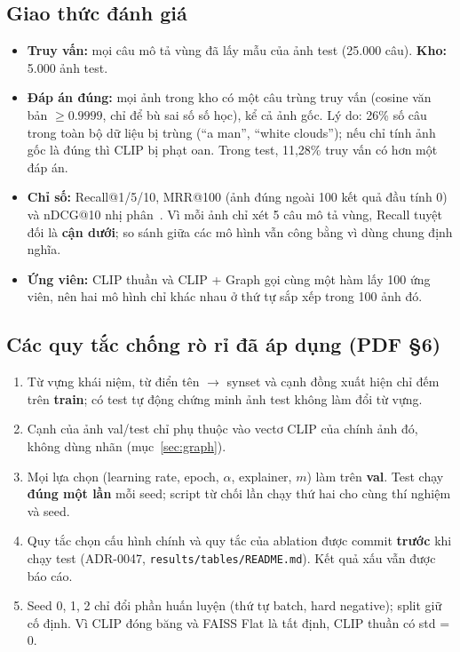 \documentclass[12pt, a4paper]{article}
\newcommand{\code}[1]{\texttt{#1}}
\begin{document}
\subsection{Giao thức đánh giá}
\label{sec:protocol}
\begin{itemize}
\item \textbf{Truy vấn:} mọi câu mô tả vùng đã lấy mẫu của ảnh test (25.000 câu). \textbf{Kho:} 5.000 ảnh test.
\item \textbf{Đáp án đúng:} mọi ảnh trong kho có một câu trùng truy vấn (cosine văn bản $\ge 0.9999$, chỉ để bù sai số số học), kể cả ảnh gốc. Lý do: 26\% số câu trong toàn bộ dữ liệu bị trùng (``a man'', ``white clouds''); nếu chỉ tính ảnh gốc là đúng thì CLIP bị phạt oan. Trong test, 11,28\% truy vấn có hơn một đáp án.
\item \textbf{Chỉ số:} Recall@1/5/10, MRR@100 (ảnh đúng ngoài 100 kết quả đầu tính 0) và nDCG@10 nhị phân~\cite{jarvelin2002ndcg}. Vì mỗi ảnh chỉ xét 5 câu mô tả vùng, Recall tuyệt đối là \textbf{cận dưới}; so sánh giữa các mô hình vẫn công bằng vì dùng chung định nghĩa.
\item \textbf{Ứng viên:} CLIP thuần và CLIP + Graph gọi cùng một hàm lấy 100 ứng viên, nên hai mô hình chỉ khác nhau ở thứ tự sắp xếp trong 100 ảnh đó.
\end{itemize}

\subsection{Các quy tắc chống rò rỉ đã áp dụng (PDF §6)}
\begin{enumerate}
\item Từ vựng khái niệm, từ điển tên $\to$ synset và cạnh đồng xuất hiện chỉ đếm trên \textbf{train}; có test tự động chứng minh ảnh test không làm đổi từ vựng.
\item Cạnh của ảnh val/test chỉ phụ thuộc vào vectơ CLIP của chính ảnh đó, không dùng nhãn (mục~\ref{sec:graph}).
\item Mọi lựa chọn (learning rate, epoch, $\alpha$, explainer, $m$) làm trên \textbf{val}. Test chạy \textbf{đúng một lần} mỗi seed; script từ chối lần chạy thứ hai cho cùng thí nghiệm và seed.
\item Quy tắc chọn cấu hình chính và quy tắc của ablation được commit \textbf{trước} khi chạy test (ADR-0047, \code{results/tables/README.md}). Kết quả xấu vẫn được báo cáo.
\item Seed 0, 1, 2 chỉ đổi phần huấn luyện (thứ tự batch, hard negative); split giữ cố định. Vì CLIP đóng băng và FAISS Flat là tất định, CLIP thuần có std = 0.
\end{enumerate}
\end{document}
